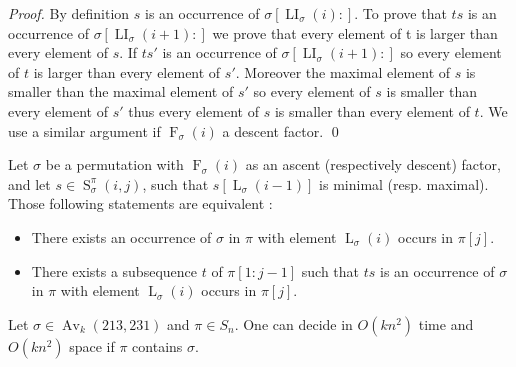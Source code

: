 \documentclass[a4paper]{llncs}
\DeclareMathOperator{\AV}{Av}
\newcommand{\ptext}{\pi}
\newcommand{\pmotif}{\sigma}
\DeclareMathOperator{\firsta}{L}
\newcommand{\first}[2]{\firsta_{{#1}}({#2})}
\DeclareMathOperator{\firstia}{LI}
\newcommand{\firsti}[2]{\firstia_{{#1}}({#2})}
\DeclareMathOperator{\factora}{F}
\newcommand{\factor}[2]{\factora_{{#1}}({#2})}
\DeclareMathOperator{\SETa}{S}
\newcommand{\SET}[4]{\SETa_{{#1}}^{{#2}}({#3},{#4})}
\begin{document}
\begin{proof}
By definition $s$ is an occurrence of $\pmotif[\firsti{\pmotif}{i}:]$. To prove that $ts$ is an occurrence of $\pmotif[\firsti{\pmotif}{i+1}:]$ we prove that every element of t is larger than every element of $s$. If $ts'$ is an occurrence of $\pmotif[\firsti{\pmotif}{i+1}:]$ so every element of $t$ is larger than every element of $s'$. Moreover the maximal element of $s$ is smaller than  the maximal element of $s'$ so every element of $s$ is smaller than every element of $s'$ thus every element of $s$ is smaller than every element of $t$. We use a similar argument if $\factor{\pmotif}{i}$ a descent factor.
\qed
\end{proof}

\begin{corollary}
Let $\pmotif$ be a permutation 
with $\factor{\pmotif}{i}$ as an ascent (respectively descent) factor,
and let $s \in \SET{\pmotif}{\ptext}{i}{j}$, such that $s[\first{\pmotif}{i-1}]$ is minimal (resp. maximal). 
Those following statements are equivalent :
\begin{itemize}
	\item There exists an 
	occurrence of $\pmotif$ in $\ptext$ with element $\first{\pmotif}{i}$ occurs in $\ptext[j]$.
	\item There exists a subsequence $t$ of $\ptext[1:j-1]$  such that $ts$ is an occurrence of $\pmotif$ in $\ptext$ with element $\first{\pmotif}{i}$ occurs in $\ptext[j]$. 
\end{itemize}
\end{corollary}


\begin{proposition}
	\label{Proposition:sigma avoids 213 and 231}
	Let $\sigma \in \AV_k(213,231)$ and $\pi \in S_n$.
	One can decide in $O(kn^2)$ time
	and $O(kn^2)$ space if $\pi$ contains $\sigma$.
\end{proposition}

\end{document}
